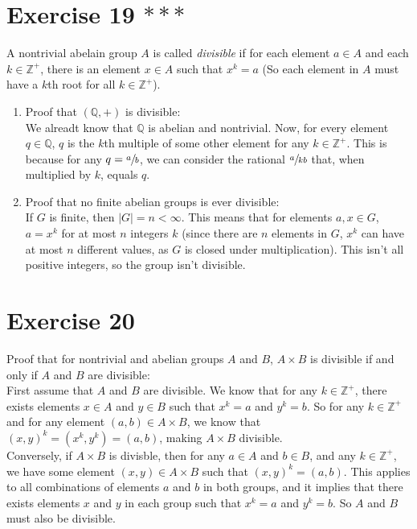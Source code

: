 \documentclass{article}
\newcommand{\Z}{\mathbb{Z}}
\newcommand{\Q}{\mathbb{Q}}
\begin{document}
    \section*{Exercise 19 $***$}
    A nontrivial abelain group $A$ is called \textit{divisible}
    if for each element $a \in A$ and each $k \in \Z^+$,
    there is an element $x \in A$ such that $x^k = a$
    (So each element in $A$ must have a $k$th root for all $k \in \Z^+$).
    \begin{enumerate}[label=\textbf{\alph*.}]
        \item
            Proof that $(\Q, +)$ is divisible: \\
            We alreadt know that $\Q$ is abelian and nontrivial.
            Now, for every element $q \in \Q$,
            $q$ is the $k$th multiple of some other element 
            for any $k \in \Z^+$.
            This is because for any $q = \sfrac{a}{b}$,
            we can consider the rational $\sfrac{a}{kb}$
            that, when multiplied by $k$,
            equals $q$.
        \item
            Proof that no finite abelian groups is ever divisible: \\
            If $G$ is finite,
            then $|G| = n < \infty$.
            This means that for elements $a, x \in G$,
            $a = x^k$ for at most $n$ integers $k$
            (since there are $n$ elements in $G$,
            $x^k$ can have at most $n$ different values,
            as $G$ is closed under multiplication).
            This isn't all positive integers,
            so the group isn't divisible.
    \end{enumerate}


    \section*{Exercise 20}
    Proof that for nontrivial and abelian groups $A$ and $B$,
    $A \times B$ is divisible if and only if $A$ and $B$ are divisible: \\
    First assume that $A$ and $B$ are divisible.
    We know that for any $k \in \Z^+$,
    there exists elements $x \in A$ and $y \in B$
    such that $x^k = a$ and $y^k = b$.
    So for any $k \in \Z^+$ and for any element $(a, b) \in A \times B$,
    we know that $(x, y)^k = (x^k, y^k) = (a, b)$,
    making $A \times B$ divisible. \\
    Conversely, if $A \times B$ is divisble,
    then for any $a \in A$ and $b \in B$,
    and any $k \in \Z^+$,
    we have some element $(x, y) \in A \times B$
    such that $(x, y)^k = (a, b)$.
    This applies to all combinations of elements $a$ and $b$
    in both groups,
    and it implies that there exists elements $x$ and $y$
    in each group such that $x^k = a$ and $y^k = b$.
    So $A$ and $B$ must also be divisible.

    
\end{document}
